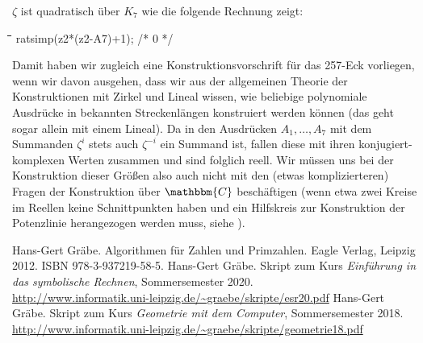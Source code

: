 \documentclass[11pt]{article}
\newcommand{\C}{\mathbbm{C}}
\newenvironment{code}{\tt \begin{tabbing}
\hskip12pt\=\hskip12pt\=\hskip12pt\=\hskip12pt\=\hskip5cm\=\hskip5cm\=\kill}
{\end{tabbing}}
\begin{document}
$\zeta$ ist quadratisch über $K_7$ wie die folgende Rechnung zeigt:
\begin{code}
ratsimp(z2*(z2-A7)+1); /* 0 */
\end{code}
Damit haben wir zugleich eine Konstruktionsvorschrift für das 257-Eck
vorliegen, wenn wir davon ausgehen, dass wir aus der allgemeinen Theorie der
Konstruktionen mit Zirkel und Lineal wissen, wie beliebige polynomiale
Ausdrücke in bekannten Streckenlängen konstruiert werden können (das geht
sogar allein mit einem Lineal).  Da in den Ausdrücken $A_1,\ldots,A_7$ mit
dem Summanden $\zeta^i$ stets auch $\zeta^{-i}$ ein Summand ist, fallen diese
mit ihren konjugiert-komplexen Werten zusammen und sind folglich reell.  Wir
müssen uns bei der Konstruktion dieser Größen also auch nicht mit den (etwas
komplizierteren) Fragen der Konstruktion über $\C$ beschäftigen (wenn etwa
zwei Kreise im Reellen keine Schnittpunkten haben und ein Hilfskreis zur
Konstruktion der Potenzlinie herangezogen werden muss, siehe
\cite{Graebe-Geo}).


\begin{thebibliography}{xxx}
 Hans-Gert Gräbe. Algorithmen für Zahlen und Primzahlen.
  Eagle Verlag, Leipzig 2012. ISBN 978-3-937219-58-5. 
 Hans-Gert Gräbe.  Skript zum Kurs \emph{Einführung in das
  symbolische Rechnen}, Sommersemester 2020.\\
  \url{http://www.informatik.uni-leipzig.de/~graebe/skripte/esr20.pdf}
 Hans-Gert Gräbe.  Skript zum Kurs \emph{Geometrie mit dem
  Computer}, Sommersemester 2018.\\
  \url{http://www.informatik.uni-leipzig.de/~graebe/skripte/geometrie18.pdf}
\end{thebibliography}
\end{document}
